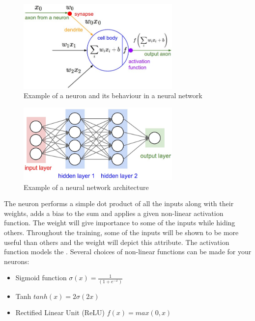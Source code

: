 \begin{figure}[htbp]
	\centering
		\includegraphics[width=8cm]{Figures/Neuron.png}
	\caption[Neuron Example]{Example of a neuron and its behaviour in a neural network \cite{Karpathy2018}}
	\label{fig:Neuron}
\end{figure}

\begin{figure}[htbp]
	\centering
		\includegraphics[width=8cm]{Figures/NN.png}
	\caption[Neural Network Example]{Example of a neural network architecture \cite{Karpathy2018}}
	\label{fig:NN}
\end{figure}

The neuron performs a simple dot product of all the inputs along with their weights, adds a bias to the sum and applies a given non-linear activation function. The weight will give importance to some of the inputs while hiding others. Throughout the training, some of the inputs will be shown to be more useful than others and the weight will depict this attribute. The activation function models the . Several choices of non-linear functions can be made for your neurons:
\begin{itemize}
  \item Sigmoid function $\sigma(x) = \frac{1}{(1+e^{-x})}$
  \item Tanh $tanh(x) = 2\sigma(2x)$
  \item Rectified Linear Unit (ReLU) $ f(x) = max(0,x) $
\end{itemize}

